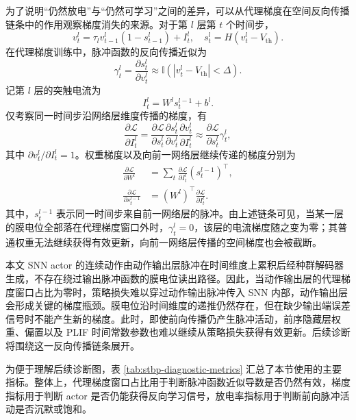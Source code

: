 \documentclass[UTF8,zihao=-4,oneside,openany]{ctexbook}
\begin{document}
为了说明“仍然放电”与“仍然可学习”之间的差异，可以从代理梯度在空间反向传播链条中的作用观察梯度消失的来源。对于第 $l$ 层第 $t$ 个时间步，
\begin{equation}
v_t^l=\tau_l v_{t-1}^l(1-s_{t-1}^l)+I_t^l,\quad
s_t^l=H(v_t^l-V_{\mathrm{th}}).
\end{equation}
在代理梯度训练中，脉冲函数的反向传播近似为
\begin{equation}
\gamma_t^l
=
\frac{\partial s_t^l}{\partial v_t^l}
\approx
\mathbb{I}\left(|v_t^l-V_{\mathrm{th}}|<\Delta\right).
\end{equation}
记第 $l$ 层的突触电流为
\begin{equation*}
I_t^l=W^l s_t^{l-1}+b^l.
\end{equation*}
仅考察同一时间步沿网络层维度传播的梯度，有
\begin{equation}
\frac{\partial \mathcal{L}}{\partial I_t^l}
=
\frac{\partial \mathcal{L}}{\partial s_t^l}
\frac{\partial s_t^l}{\partial v_t^l}
\frac{\partial v_t^l}{\partial I_t^l}
\approx
\frac{\partial \mathcal{L}}{\partial s_t^l}\gamma_t^l,
\label{eq:current-gradient-chain}
\end{equation}
其中 $\partial v_t^l/\partial I_t^l=1$。权重梯度以及向前一网络层继续传递的梯度分别为
\begin{equation}
\begin{aligned}
\frac{\partial \mathcal{L}}{\partial W^l}
&=
\sum_t
\frac{\partial \mathcal{L}}{\partial I_t^l}
(s_t^{l-1})^\top, \\
\frac{\partial \mathcal{L}}{\partial s_t^{l-1}}
&=
(W^l)^\top
\frac{\partial \mathcal{L}}{\partial I_t^l}.
\end{aligned}
\label{eq:spatial-gradient-chain}
\end{equation}
其中，$s_t^{l-1}$ 表示同一时间步来自前一网络层的脉冲。由上述链条可见，当某一层的膜电位全部落在代理梯度窗口外时，$\gamma_t^l=0$，该层的电流梯度随之变为零；其普通权重无法继续获得有效更新，向前一网络层传播的空间梯度也会被截断。

本文 SNN actor 的连续动作由动作输出层脉冲在时间维度上累积后经种群解码器生成，不存在绕过输出脉冲函数的膜电位读出路径。因此，当动作输出层的代理梯度窗口占比为零时，策略损失难以穿过动作输出脉冲传入 SNN 内部，动作输出层会形成关键的梯度瓶颈。膜电位沿时间维度的递推仍然存在，但在缺少输出端误差信号时不能产生新的梯度。此时，即使前向传播仍产生脉冲活动，前序隐藏层权重、偏置以及 PLIF 时间常数参数也难以继续从策略损失获得有效更新。后续诊断将围绕这一反向传播链条展开。

为便于理解后续诊断图，表 \ref{tab:stbp-diagnostic-metrics} 汇总了本节使用的主要指标。整体上，代理梯度窗口占比用于判断脉冲函数近似导数是否仍然有效，梯度指标用于判断 actor 是否仍能获得反向学习信号，放电率指标用于判断前向脉冲活动是否沉默或饱和。
\end{document}
